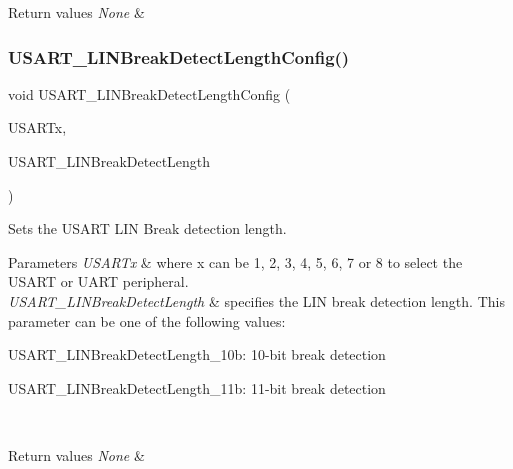\begin{DoxyRetVals}{Return values}
{\em None} & \\
\hline
\end{DoxyRetVals}
\mbox{\label{group___u_s_a_r_t_ga7bc2d291831cbc5e53e73337308029b5}} 
\subsubsection{\texorpdfstring{U\+S\+A\+R\+T\+\_\+\+L\+I\+N\+Break\+Detect\+Length\+Config()}{USART\_LINBreakDetectLengthConfig()}}
{\footnotesize\ttfamily void U\+S\+A\+R\+T\+\_\+\+L\+I\+N\+Break\+Detect\+Length\+Config (\begin{DoxyParamCaption}\item[{U\+S\+A\+R\+T\+\_\+\+Type\+Def $\ast$}]{U\+S\+A\+R\+Tx,  }\item[{uint16\+\_\+t}]{U\+S\+A\+R\+T\+\_\+\+L\+I\+N\+Break\+Detect\+Length }\end{DoxyParamCaption})}



Sets the U\+S\+A\+RT L\+IN Break detection length. 


\begin{DoxyParams}{Parameters}
{\em U\+S\+A\+R\+Tx} & where x can be 1, 2, 3, 4, 5, 6, 7 or 8 to select the U\+S\+A\+RT or U\+A\+RT peripheral. \\
\hline
{\em U\+S\+A\+R\+T\+\_\+\+L\+I\+N\+Break\+Detect\+Length} & specifies the L\+IN break detection length. This parameter can be one of the following values\+: \begin{DoxyItemize}
\item U\+S\+A\+R\+T\+\_\+\+L\+I\+N\+Break\+Detect\+Length\+\_\+10b\+: 10-\/bit break detection \item U\+S\+A\+R\+T\+\_\+\+L\+I\+N\+Break\+Detect\+Length\+\_\+11b\+: 11-\/bit break detection \end{DoxyItemize}
\\
\hline
\end{DoxyParams}

\begin{DoxyRetVals}{Return values}
{\em None} & \\
\hline
\end{DoxyRetVals}
\mbox{\label{group___u_s_a_r_t_ga9fdd6296f4ca4acdfcbd58bf56bd4185}} 
